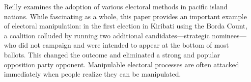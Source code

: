 Reilly examines the adoption of various electoral methods in pacific island nations.  While fascinating as a whole, this paper provides an important example of electoral manipulation:  in the first election in Kiribati using the Borda Count, a coalition colluded by running two additional candidates—strategic nominees—who did not campaign and were intended to appear at the bottom of most ballots.  This changed the outcome and eliminated a strong and popular opposition party opponent.  Manipulable electoral processes are often attacked immediately when people realize they can be manipulated.
